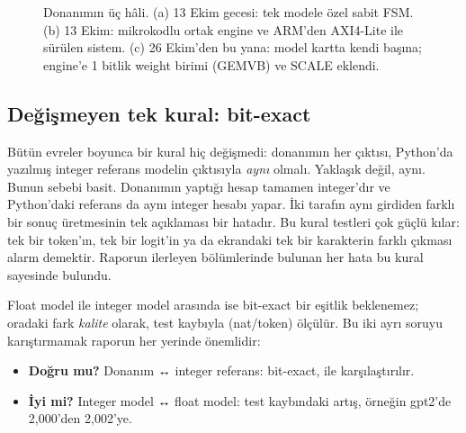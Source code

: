 \begin{figure}[htb]
\centering
{}
\caption{Donanımın üç hâli. (a) 13 Ekim gecesi: tek modele özel sabit FSM. (b) 13 Ekim: mikrokodlu ortak engine ve ARM'den AXI4-Lite ile sürülen sistem. (c) 26 Ekim'den bu yana: model kartta kendi başına; engine'e 1 bitlik weight birimi (GEMVB) ve SCALE eklendi.}
\label{fig:evrim}
\end{figure}

\subsection{Değişmeyen tek kural: bit-exact}

Bütün evreler boyunca bir kural hiç değişmedi: donanımın her çıktısı, Python'da yazılmış integer referans modelin çıktısıyla \emph{aynı} olmalı. Yaklaşık değil, aynı. Bunun sebebi basit. Donanımın yaptığı hesap tamamen integer'dır ve Python'daki referans da aynı integer hesabı yapar. İki tarafın aynı girdiden farklı bir sonuç üretmesinin tek açıklaması bir hatadır. Bu kural testleri çok güçlü kılar: tek bir token'ın, tek bir logit'in ya da ekrandaki tek bir karakterin farklı çıkması alarm demektir. Raporun ilerleyen bölümlerinde bulunan her hata bu kural sayesinde bulundu.

Float model ile integer model arasında ise bit-exact bir eşitlik beklenemez; oradaki fark \emph{kalite} olarak, test kaybıyla (nat/token) ölçülür. Bu iki ayrı soruyu karıştırmamak raporun her yerinde önemlidir:
\begin{itemize}
  \item \textbf{Doğru mu?} Donanım ↔ integer referans: bit-exact, \code{==} ile karşılaştırılır.
  \item \textbf{İyi mi?} Integer model ↔ float model: test kaybındaki artış, örneğin gpt2'de 2,000'den 2,002'ye.
\end{itemize}
